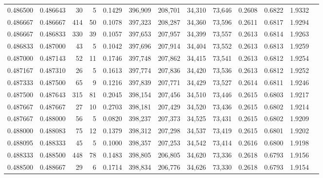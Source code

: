 \begin{tabular}{rrrrrrrrrrrrr}
0.486500 & 0.486643 &    30 &   5 &                                     0.1429 & 396,909 & 208,701 &  34,310 &  73,646 & 0.2608 & 0.6822 & 1.9332 \\
0.486667 & 0.486667 &   414 &  50 &                                     0.1078 & 397,323 & 208,287 &  34,360 &  73,596 & 0.2611 & 0.6817 & 1.9294 \\
0.486667 & 0.486833 &   330 &  39 &                                     0.1057 & 397,653 & 207,957 &  34,399 &  73,557 & 0.2613 & 0.6814 & 1.9263 \\
0.486833 & 0.487000 &    43 &   5 &                                     0.1042 & 397,696 & 207,914 &  34,404 &  73,552 & 0.2613 & 0.6813 & 1.9259 \\
0.487000 & 0.487143 &    52 &  11 &                                     0.1746 & 397,748 & 207,862 &  34,415 &  73,541 & 0.2613 & 0.6812 & 1.9254 \\
0.487167 & 0.487310 &    26 &   5 &                                     0.1613 & 397,774 & 207,836 &  34,420 &  73,536 & 0.2613 & 0.6812 & 1.9252 \\
0.487333 & 0.487500 &    65 &   9 &                                     0.1216 & 397,839 & 207,771 &  34,429 &  73,527 & 0.2614 & 0.6811 & 1.9246 \\
0.487500 & 0.487643 &   315 &  81 &                                     0.2045 & 398,154 & 207,456 &  34,510 &  73,446 & 0.2615 & 0.6803 & 1.9217 \\
0.487667 & 0.487667 &    27 &  10 &                                     0.2703 & 398,181 & 207,429 &  34,520 &  73,436 & 0.2615 & 0.6802 & 1.9214 \\
0.487667 & 0.488000 &    56 &   5 &                                     0.0820 & 398,237 & 207,373 &  34,525 &  73,431 & 0.2615 & 0.6802 & 1.9209 \\
0.488000 & 0.488083 &    75 &  12 &                                     0.1379 & 398,312 & 207,298 &  34,537 &  73,419 & 0.2615 & 0.6801 & 1.9202 \\
0.488095 & 0.488333 &    45 &   5 &                                     0.1000 & 398,357 & 207,253 &  34,542 &  73,414 & 0.2616 & 0.6800 & 1.9198 \\
0.488333 & 0.488500 &   448 &  78 &                                     0.1483 & 398,805 & 206,805 &  34,620 &  73,336 & 0.2618 & 0.6793 & 1.9156 \\
0.488500 & 0.488667 &    29 &   6 &                                     0.1714 & 398,834 & 206,776 &  34,626 &  73,330 & 0.2618 & 0.6793 & 1.9154 \\

\end{tabular}
